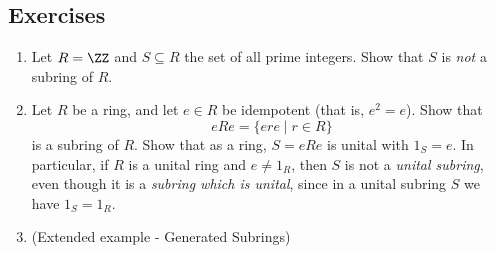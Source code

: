 \documentclass{article}
\begin{document}
\subsection*{Exercises}

\begin{enumerate}
\item Let $R = \ZZ$ and $S \subseteq R$ the set of all prime integers. Show that $S$ is \emph{not} a subring of $R$.

\item Let $R$ be a ring, and let $e \in R$ be idempotent (that is, $e^2 = e$). Show that \[ eRe = \{ ere \mid r \in R \} \] is a subring of $R$. Show that as a ring, $S = eRe$ is unital with $1_S = e$. In particular, if $R$ is a unital ring and $e \neq 1_R$, then $S$ is not a \emph{unital subring}, even though it is a \emph{subring which is unital}, since in a unital subring $S$ we have $1_S = 1_R$.

\item (Extended example - Generated Subrings)
\end{enumerate}
\end{document}
